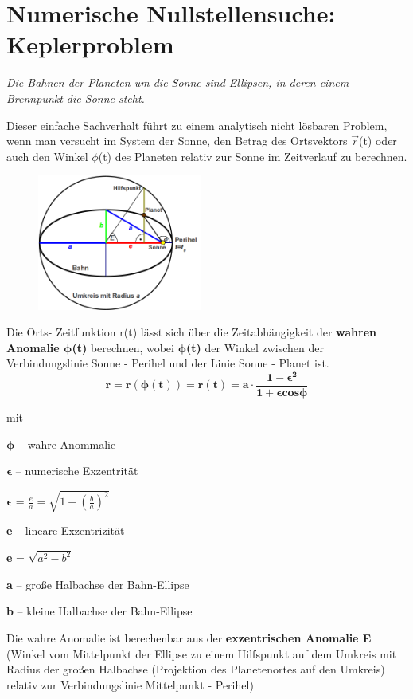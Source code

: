\documentclass{scrartcl}	    %
\begin{document}

\section*{Numerische Nullstellensuche: Keplerproblem}
\emph{Die Bahnen der Planeten um die Sonne sind Ellipsen, in deren einem Brennpunkt die Sonne steht.}

Dieser einfache Sachverhalt führt zu einem analytisch nicht lösbaren Problem, wenn man versucht im System der Sonne, den Betrag des Ortsvektors $\vec{r}$(t) oder auch den Winkel $\phi$(t) des Planeten relativ zur Sonne im Zeitverlauf zu berechnen.

\begin{figure}
\includegraphics[width=0.48\textwidth]{Kepler_Schema.png}
\end{figure}

Die Orts- Zeitfunktion r(t) lässt sich über
die Zeitabhängigkeit der \textbf{wahren Anomalie
$\boldsymbol{\phi}$(t)} berechnen, wobei $\boldsymbol{\phi}$\textbf{(t)} der Winkel zwischen der Verbindungslinie Sonne - Perihel und der Linie Sonne - Planet ist.
\[
\mathbf{ r = r(\boldsymbol{\phi} (t)) = r(t) = a \cdot \frac{1-\boldsymbol{\epsilon}^2}{1+\boldsymbol{\epsilon} cos \boldsymbol{\phi}}}
\]

mit

\begin{description}
\item $\boldsymbol{\phi}$ -- wahre Anommalie
\item $\boldsymbol{\epsilon}$ -- numerische Exzentrität
\item $\boldsymbol{\epsilon}$ = $\frac{e}{a} = \sqrt{1-{(\frac{b}{a})}^2}$
\item \textbf{e} -- lineare Exzentrizität
\item \textbf{e} = $\sqrt{a^2 - b^2}$
\item \textbf{a} -- große Halbachse der Bahn-Ellipse
\item \textbf{b} -- kleine Halbachse der Bahn-Ellipse
\end{description}
Die wahre Anomalie ist berechenbar aus der \textbf{exzentrischen Anomalie E} (Winkel vom Mittelpunkt der Ellipse zu einem Hilfspunkt auf dem Umkreis mit Radius der großen Halbachse (Projektion des Planetenortes auf den Umkreis) relativ zur Verbindungslinie Mittelpunkt - Perihel)
\end{document}
